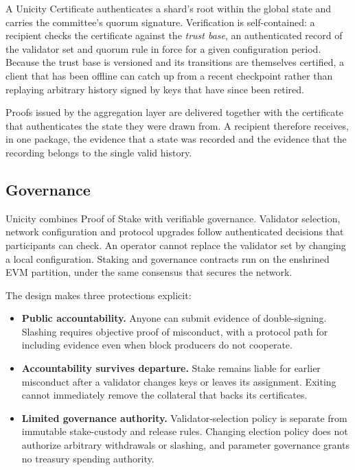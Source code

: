 A Unicity Certificate authenticates a shard's root within the global state and carries the committee's quorum signature. Verification is self-contained: a recipient checks the certificate against the \emph{trust base}, an authenticated record of the validator set and quorum rule in force for a given configuration period. Because the trust base is versioned and its transitions are themselves certified, a client that has been offline can catch up from a recent checkpoint rather than replaying arbitrary history signed by keys that have since been retired.

Proofs issued by the aggregation layer are delivered together with the certificate that authenticates the state they were drawn from. A recipient therefore receives, in one package, the evidence that a state was recorded and the evidence that the recording belongs to the single valid history.

\subsection{Governance}

Unicity combines Proof of Stake with verifiable governance. Validator selection, network configuration and protocol upgrades follow authenticated decisions that participants can check. An operator cannot replace the validator set by changing a local configuration. Staking and governance contracts run on the enshrined EVM partition, under the same consensus that secures the network.

The design makes three protections explicit:
\begin{itemize}
    \item \textbf{Public accountability.} Anyone can submit evidence of double-signing. Slashing requires objective proof of misconduct, with a protocol path for including evidence even when block producers do not cooperate.
    \item \textbf{Accountability survives departure.} Stake remains liable for earlier misconduct after a validator changes keys or leaves its assignment. Exiting cannot immediately remove the collateral that backs its certificates.
    \item \textbf{Limited governance authority.} Validator-selection policy is separate from immutable stake-custody and release rules. Changing election policy does not authorize arbitrary withdrawals or slashing, and parameter governance grants no treasury spending authority.
\end{itemize}

